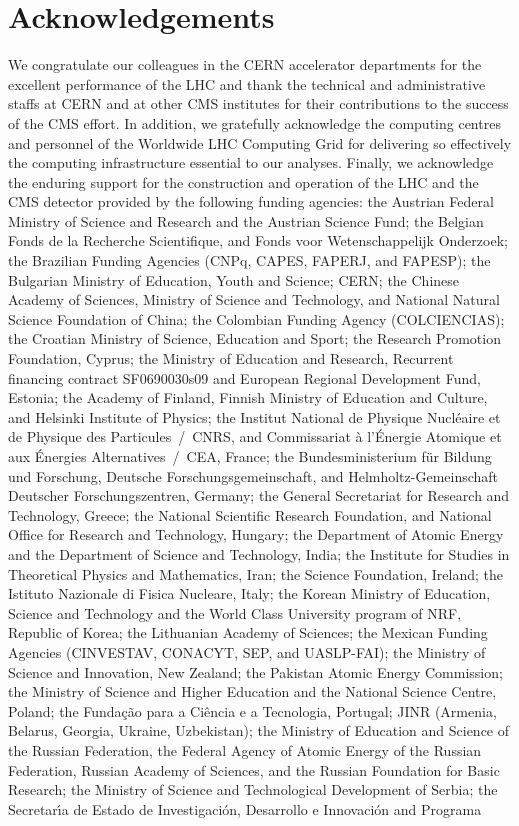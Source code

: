\documentclass[11pt,twoside,a4paper,cmspaper,final,collab]{cms-tdr}
\begin{document}
\section*{Acknowledgements}
 We congratulate our colleagues in the CERN accelerator departments for the excellent performance of the LHC and thank the technical and administrative staffs at CERN and at other CMS institutes for their contributions to the success of the CMS effort. In addition, we gratefully acknowledge the computing centres and personnel of the Worldwide LHC Computing Grid for delivering so effectively the computing infrastructure essential to our analyses. Finally, we acknowledge the enduring support for the construction and operation of the LHC and the CMS detector provided by the following funding agencies: the Austrian Federal Ministry of Science and Research and the Austrian Science Fund; the Belgian Fonds de la Recherche Scientifique, and Fonds voor Wetenschappelijk Onderzoek; the Brazilian Funding Agencies (CNPq, CAPES, FAPERJ, and FAPESP); the Bulgarian Ministry of Education, Youth and Science; CERN; the Chinese Academy of Sciences, Ministry of Science and Technology, and National Natural Science Foundation of China; the Colombian Funding Agency (COLCIENCIAS); the Croatian Ministry of Science, Education and Sport; the Research Promotion Foundation, Cyprus; the Ministry of Education and Research, Recurrent financing contract SF0690030s09 and European Regional Development Fund, Estonia; the Academy of Finland, Finnish Ministry of Education and Culture, and Helsinki Institute of Physics; the Institut National de Physique Nucl\'eaire et de Physique des Particules~/~CNRS, and Commissariat \`a l'\'Energie Atomique et aux \'Energies Alternatives~/~CEA, France; the Bundesministerium f\"ur Bildung und Forschung, Deutsche Forschungsgemeinschaft, and Helmholtz-Gemeinschaft Deutscher Forschungszentren, Germany; the General Secretariat for Research and Technology, Greece; the National Scientific Research Foundation, and National Office for Research and Technology, Hungary; the Department of Atomic Energy and the Department of Science and Technology, India; the Institute for Studies in Theoretical Physics and Mathematics, Iran; the Science Foundation, Ireland; the Istituto Nazionale di Fisica Nucleare, Italy; the Korean Ministry of Education, Science and Technology and the World Class University program of NRF, Republic of Korea; the Lithuanian Academy of Sciences; the Mexican Funding Agencies (CINVESTAV, CONACYT, SEP, and UASLP-FAI); the Ministry of Science and Innovation, New Zealand; the Pakistan Atomic Energy Commission; the Ministry of Science and Higher Education and the National Science Centre, Poland; the Funda\c{c}\~ao para a Ci\^encia e a Tecnologia, Portugal; JINR (Armenia, Belarus, Georgia, Ukraine, Uzbekistan); the Ministry of Education and Science of the Russian Federation, the Federal Agency of Atomic Energy of the Russian Federation, Russian Academy of Sciences, and the Russian Foundation for Basic Research; the Ministry of Science and Technological Development of Serbia; the Secretar\'{\i}a de Estado de Investigaci\'on, Desarrollo e Innovaci\'on and Programa 
\end{document}
